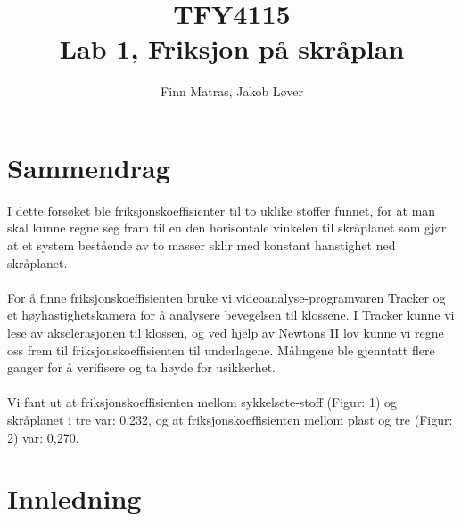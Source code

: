 \documentclass[10pt,a4paper]{report}
\author{Finn Matras, Jakob Løver}
\title{{\LARGE TFY4115}\\{\large Lab 1, Friksjon på skråplan}}
\begin{document}
\renewcommand{\contentsname}{Innhold}
\renewcommand{\cftchapleader}{\cftdotfill{\cftdotsep}}
\renewcommand{\cftpartleader}{\cftdotfill{\cftdotsep}}

\maketitle
\tableofcontents

\chapter*{Sammendrag}
I dette forsøket ble friksjonskoeffisienter til to uklike stoffer funnet, for at man skal kunne regne seg fram til en den horisontale vinkelen til skråplanet som gjør at et system bestående av to masser sklir med konstant hanstighet ned skråplanet.\\
\\For å finne friksjonskoeffisienten bruke vi videoanalyse-programvaren Tracker og et høyhastighetskamera for å analysere bevegelsen til klossene. I Tracker kunne vi lese av akselerasjonen til klossen, og ved hjelp av Newtons II lov kunne vi regne oss frem til friksjonskoeffisienten til underlagene. Målingene ble gjenntatt flere ganger for å verifisere og ta høyde for usikkerhet.\\
\\Vi fant ut at friksjonskoeffisienten mellom sykkelsete-stoff (Figur: 1) og skråplanet i tre var: 0,232, og at friksjonskoeffisienten mellom plast og tre (Figur: 2) var: 0,270.


\chapter*{Innledning}
\end{document}
